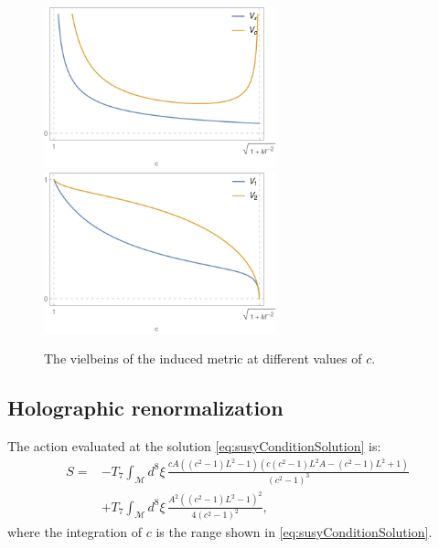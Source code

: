 \begin{figure}[t]
\begin{center}
\includegraphics[width=0.6\textwidth]{pictures/vxvc.png}
\includegraphics[width=0.6\textwidth]{pictures/v1v2.png}
\end{center}
\caption{\label{fig:vielbeins} The vielbeins of the induced metric at different values of $c$.}
\end{figure}



\subsection{Holographic renormalization}

The action evaluated at the solution \eqref{eq:susyConditionSolution} is:
\begin{align}\label{eq:ActionAtSolution}
 S = & -T_7 \int_\mathcal{M} d^8\xi \, 
 \frac{c A \left(\left(c^2-1\right) L^2-1\right) \left(c \left(c^2-1\right) L^2 A-\left(c^2-1\right) L^2+1\right)}{\left(c^2-1\right)^3}
 \nonumber \\
     & +T_7\int _\mathcal{M} d^8\xi \, 
 \frac{A^2 \left(\left(c^2-1\right) L^2-1\right)^2}{4 \left(c^2-1\right)^2},
\end{align}
where the integration of $c$ is the range shown in \eqref{eq:susyConditionSolution}.

